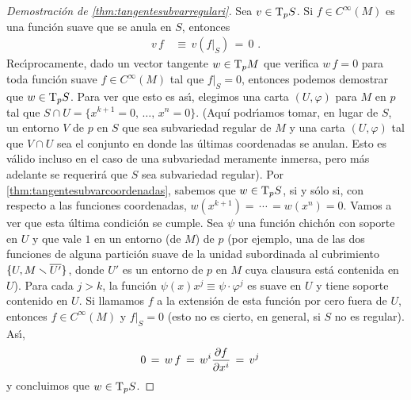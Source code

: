 \begin{proof}[Demostraci\'{o}n de \ref{thm:tangentesubvarregulari}]
	Sea $v\in\tangente[p]{S}$. Si $f\in C^{\infty}(M)$ es una funci\'{o}n
	suave que se anula en $S$, entonces
	\begin{align*}
		v\,f & \,\equiv\,v(f|_{S}) \,=\, 0
		\text{ .}
	\end{align*}
	Rec\'{\i}procamente, dado un vector tangente $w\in\tangente[p]{M}$
	que verifica $w\,f=0$ para toda funci\'{o}n suave $f\in C^{\infty}(M)$
	tal que $f|_{S}=0$, entonces podemos demostrar que
	$w\in\tangente[p]{S}$. Para ver que esto es as\'{\i}, elegimos
	una carta $(U,\varphi)$ para $M$ en $p$ tal que
	$S\cap U=\{x^{k+1}=0,\,\dots,\,x^{n}=0\}$. (Aqu\'{i} podr\'{\i}amos
	tomar, en lugar de $S$, un entorno $V$ de $p$ en $S$ que sea
	subvariedad regular de $M$ y una carta $(U,\varphi)$ tal que
	$V\cap U$ sea el conjunto en donde las \'{u}ltimas coordenadas se
	anulan. Esto es v\'{a}lido incluso en el caso de una subvariedad
	meramente inmersa, pero m\'{a}s adelante se requerir\'{a} que $S$
	sea subvariedad regular). Por \ref{thm:tangentesubvarcoordenadas},
	sabemos que $w\in\tangente[p]{S}$, si y s\'{o}lo si, con
	respecto a las funciones coordenadas,
	$w(x^{k+1})=\,\cdots\,=w(x^{n})=0$. Vamos a ver que esta \'{u}ltima
	condici\'{o}n se cumple. Sea $\psi$ una funci\'{o}n chich\'{o}n
	con soporte en $U$ y que vale $1$ en un entorno (de $M$) de $p$
	(por ejemplo, una de las dos funciones de alguna partici\'{o}n
	suave de la unidad subordinada al cubrimiento
	$\{U,M\smallsetminus\overline{U'}\}$, donde $U'$ es un entorno de $p$ en $M$
	cuya clausura est\'{a} contenida en $U$). Para cada $j>k$, la
	funci\'{o}n $\psi(x)x^{j}\equiv\psi\cdot\varphi^{j}$ es suave en
	$U$ y tiene soporte contenido en $U$. Si llamamos $f$ a la 
	extensi\'{o}n de esta funci\'{o}n por cero fuera de $U$, entonces
	$f\in C^{\infty}(M)$ y $f|_{S}=0$ (esto no es cierto, en general,
	si $S$ no es regular). As\'{\i},
	\begin{align*}
		0 & \,=\, w\,f \,=\,w^{i}\frac{\partial{f}}{\partial{x^{i}}} \,=\, v^{j}
	\end{align*}
	y concluimos que $w\in\tangente[p]{S}$.
\end{proof}

